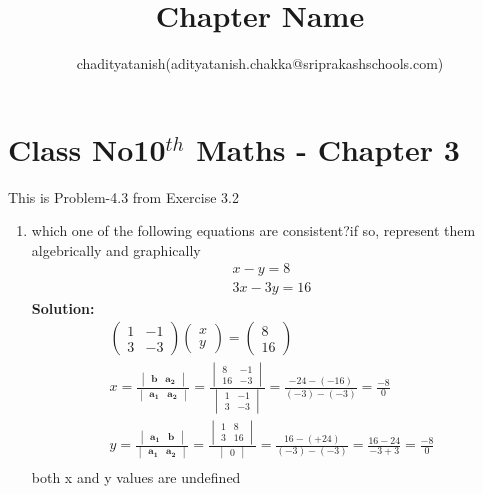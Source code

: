 \documentclass[12pt]{article}
\title{Chapter Name}
\author{chadityatanish(adityatanish.chakka@sriprakashschools.com)}
\newcommand{\myvec}[1]{\ensuremath{\begin{pmatrix}#1\end{pmatrix}}}
\newcommand{\mydet}[1]{\ensuremath{\begin{vmatrix}#1\end{vmatrix}}}
\newcommand{\solution}{\noindent \textbf{Solution: }}
\let\vec\mathbf
\begin{document}
\maketitle
\section*{Class No10$^{th}$ Maths - Chapter 3}
This is Problem-4.3 from Exercise 3.2
\begin{enumerate}
\item which one of the following equations are consistent?if so, represent them algebrically and graphically
\begin{align}
x-y=8\\
3x-3y=16 
\end{align}
\solution\\
\begin{align}
\myvec{1&-1\\3&-3}\myvec{x\\y} = \myvec{8\\16}\\
x=\frac{\mydet{\vec{b} & \vec{a_2}}}{\mydet{ \vec{a_1} &\vec{a_2} }}=
\frac{\mydet{8 & -1 \\ 16 & -3}}{\mydet{1&-1 \\ 3&-3}}=
\frac{-24 - (-16)}{(-3) - (-3)}=\frac{-8}{0} \\
y=\frac{\mydet{  \vec{a_1} & \vec{b}}}{\mydet{ \vec{a_1} &\vec{a_2} }}=
\frac{\mydet{1 & 8\\ 3 & 16}}{\mydet{0}}= 
\frac{16 - (+24)}{(-3) - (-3)}=
\frac{16-24}{-3+3} = \frac{-8}{0} \\
\end{align}
both x and y values are undefined
\end{enumerate}
\end{document}
